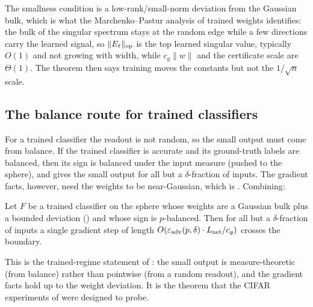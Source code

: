 The smallness condition is a low-rank/small-norm deviation from the Gaussian bulk, which is what the
Marchenko--Pastur analysis of trained weights \cite{shmaloRMT,shmaloAccuracy} identifies: the bulk of
the singular spectrum stays at the random edge while a few directions carry the learned signal, so
$\|E_\ell\|_{\mathrm{op}}$ is the top learned singular value, typically $O(1)$ and not growing with width, while
$c_g\|w\|$ and the certificate scale are $\Theta(1)$. The theorem then says training moves the
constants but not the $1/\sqrt n$ scale.

\subsection{The balance route for trained classifiers}
For a trained classifier the readout is not random, so the small output must come from balance. If the
trained classifier is accurate and its ground-truth labels are balanced, then its sign is balanced under
the input measure (pushed to the sphere), and  gives the small output for all but a
$\delta$-fraction of inputs. The gradient facts, however, need the weights to be near-Gaussian, which is
. Combining:

\begin{corollary}\label{cor:trained-frag}
Let $F$ be a trained classifier on the sphere whose weights are a Gaussian bulk plus a bounded deviation
() and whose sign is $p$-balanced. Then for all but a $\delta$-fraction of inputs a
single gradient step of length $O(\varepsilon_{\mathrm{adv}}(p,\delta)\cdot L_{\mathrm{net}}/c_g)$ crosses the
boundary.
\end{corollary}

This is the trained-regime statement of : the small output is measure-theoretic (from
balance) rather than pointwise (from a random readout), and the gradient facts hold up to the weight
deviation. It is the theorem that the CIFAR experiments of \cite{advExt} were designed to probe.


